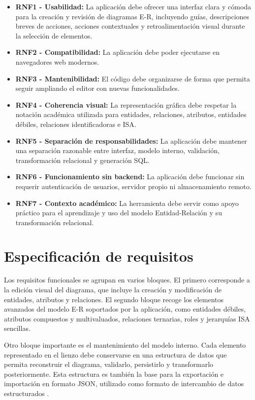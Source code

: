 \begin{itemize}
\tightlist
\item \textbf{RNF1 - Usabilidad:} La aplicación debe ofrecer una interfaz clara y cómoda para la creación y revisión de diagramas E-R, incluyendo guías, descripciones breves de acciones, acciones contextuales y retroalimentación visual durante la selección de elementos.
\item \textbf{RNF2 - Compatibilidad:} La aplicación debe poder ejecutarse en navegadores web modernos.
\item \textbf{RNF3 - Mantenibilidad:} El código debe organizarse de forma que permita seguir ampliando el editor con nuevas funcionalidades.
\item \textbf{RNF4 - Coherencia visual:} La representación gráfica debe respetar la notación académica utilizada para entidades, relaciones, atributos, entidades débiles, relaciones identificadoras e ISA.
\item \textbf{RNF5 - Separación de responsabilidades:} La aplicación debe mantener una separación razonable entre interfaz, modelo interno, validación, transformación relacional y generación SQL.
\item \textbf{RNF6 - Funcionamiento sin backend:} La aplicación debe funcionar sin requerir autenticación de usuarios, servidor propio ni almacenamiento remoto.
\item \textbf{RNF7 - Contexto académico:} La herramienta debe servir como apoyo práctico para el aprendizaje y uso del modelo Entidad-Relación y su transformación relacional.
\end{itemize}

\section{Especificación de requisitos}

Los requisitos funcionales se agrupan en varios bloques. El primero corresponde a la edición visual del diagrama, que incluye la creación y modificación de entidades, atributos y relaciones. El segundo bloque recoge los elementos avanzados del modelo E-R soportados por la aplicación, como entidades débiles, atributos compuestos y multivaluados, relaciones ternarias, roles y jerarquías ISA sencillas.

Otro bloque importante es el mantenimiento del modelo interno. Cada elemento representado en el lienzo debe conservarse en una estructura de datos que permita reconstruir el diagrama, validarlo, persistirlo y transformarlo posteriormente. Esta estructura es también la base para la exportación e importación en formato JSON, utilizado como formato de intercambio de datos estructurados \cite{ecma-json}.

